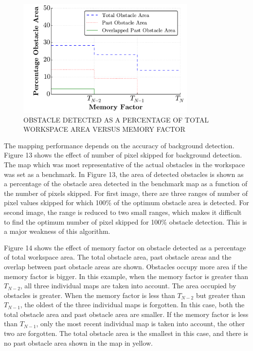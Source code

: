 \documentclass[twocolumn,10pt]{asme2e}
\begin{document}
%
\begin{figure}[t]
\begin{center}
\includegraphics[width=3.5in]{area_vs_forgetting_factor}
\caption{OBSTACLE DETECTED AS A PERCENTAGE OF TOTAL WORKSPACE AREA VERSUS MEMORY FACTOR}
\label{default}
\end{center}
\end{figure}
%

The mapping performance depends on the accuracy of background detection. Figure 13 shows the effect of number of pixel skipped for background detection. The map which was most representative of the actual obstacles in the workspace was set as a benchmark. In Figure 13, the area of detected obstacles is shown as a percentage of the obstacle area detected in the benchmark map as a function of the number of pixels skipped. For first image, there are three ranges of number of pixel values skipped for which 100\% of the optimum obstacle area is detected. For second image, the range is reduced to two small ranges, which makes it difficult to find the optimum number of pixel skipped for 100\% obstacle detection. This is a major weakness of this algorithm.


Figure 14 shows the effect of memory factor on obstacle detected as a percentage of total workspace area. The total obstacle area, past obstacle areas and the overlap between past obstacle areas are shown. Obstacles occupy more area if the memory factor is bigger. In this example, when the memory factor is greater than $T_{N-2}$, all three individual maps are taken into account. The area occupied by obstacles is greater. When the memory factor is less than $T_{N-2}$ but greater than $T_{N-1}$, the oldest of the three individual maps is forgotten. In this case, both the total obstacle area and past obstacle area are smaller. If the memory factor is less than $T_{N-1}$, only the most recent individual map is taken into account, the other two are forgotten. The total obstacle area is the smallest in this case, and there is no past obstacle area shown in the map in yellow.
\end{document}
